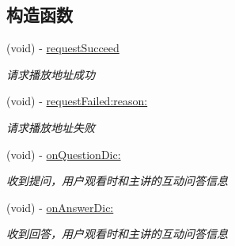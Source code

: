 \subsection*{构造函数}
\begin{DoxyCompactItemize}
\item 
\mbox{\label{protocol_request_data_delegate_01-p_abf987c7b327a9df5fb1d6eff506832fd}} 
(void) -\/ \hyperlink{protocol_request_data_delegate_01-p_abf987c7b327a9df5fb1d6eff506832fd}{request\+Succeed}
\begin{DoxyCompactList}\small\item\em 请求播放地址成功 \end{DoxyCompactList}\item 
\mbox{\label{protocol_request_data_delegate_01-p_a0df0d78d55862f66b70dca75264bbc12}} 
(void) -\/ \hyperlink{protocol_request_data_delegate_01-p_a0df0d78d55862f66b70dca75264bbc12}{request\+Failed\+:reason\+:}
\begin{DoxyCompactList}\small\item\em 请求播放地址失败 \end{DoxyCompactList}\item 
\mbox{\label{protocol_request_data_delegate_01-p_a7341816ad8c4bbda620c7783d8a3568d}} 
(void) -\/ \hyperlink{protocol_request_data_delegate_01-p_a7341816ad8c4bbda620c7783d8a3568d}{on\+Question\+Dic\+:}
\begin{DoxyCompactList}\small\item\em 收到提问，用户观看时和主讲的互动问答信息 \end{DoxyCompactList}\item 
\mbox{\label{protocol_request_data_delegate_01-p_ae5a9d7514c6ad8c448dfb3e332bc5cf8}} 
(void) -\/ \hyperlink{protocol_request_data_delegate_01-p_ae5a9d7514c6ad8c448dfb3e332bc5cf8}{on\+Answer\+Dic\+:}
\begin{DoxyCompactList}\small\item\em 收到回答，用户观看时和主讲的互动问答信息 \end{DoxyCompactList}\item 
\mbox{\label{protocol_request_data_delegate_01-p_a5995fc6c05c04b1f0a16469d574a5cd5}} 

\end{DoxyCompactItemize}
